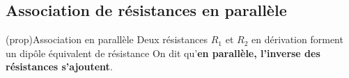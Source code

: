 \documentclass[../../main/main.tex]{subfiles}
\begin{document}
\subsection{Association de résistances en parallèle}
\begin{tcbraster}[raster columns=2, raster equal height=rows]
	\begin{tcb}[label=prop:rpara](prop){Association en parallèle}
		Deux résistances $R_1$ et $R_2$ en dérivation forment un dipôle
		équivalent de résistance
		\psw{
			\[
				\boxed{\dfrac{1}{R_{\rm eq}} = \dfrac{1}{R_1} + \dfrac{1}{R_2}}
				\Lra
				\boxed{G_{\rm eq} = G_1+G_2}
			\]
		}
		On dit qu'\textbf{en parallèle, l'inverse des résistances s'ajoutent}.
		\tcblower
		\begin{center}
\end{center}
\end{tcb}
\end{tcbraster}
\end{document}
